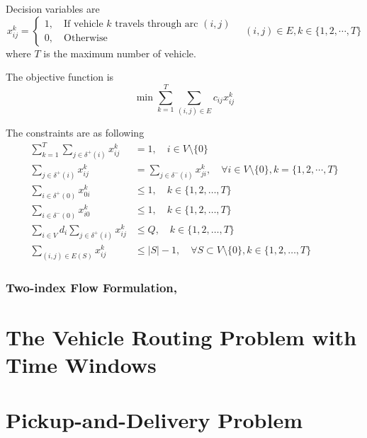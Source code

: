 					Decision variables are
					\begin{equation*}
						x_{ij}^k = \begin{cases}
										1, \quad \text{If vehicle } k \text{ travels through arc } (i, j) \\
										0, \quad \text{Otherwise}
									\end{cases} \quad (i, j) \in E, k \in \{1, 2, \cdots, T\}
					\end{equation*}
					where $T$ is the maximum number of vehicle.

					The objective function is
					\begin{equation*}
						\min \sum_{k = 1}^T \sum_{(i, j) \in E} c_{ij} x_{ij}^k
					\end{equation*}

					The constraints are as following
					\begin{align}
						\sum_{k = 1}^T \sum_{j \in \delta^+(i)} x_{ij}^k &= 1, \quad i \in V \setminus \{0\} \label{VRP:con:GoldenArcAssign}\\
						\sum_{j \in \delta^+(i)} x_{ij}^k &= \sum_{j \in \delta^-(i)} x_{ji}^k, \quad \forall i \in V \setminus \{0\}, k = \{1, 2, \cdots, T\} \label{VRP:con:GoldenBalance} \\
						\sum_{i \in \delta^+(0)} x_{0i}^k &\le 1, \quad k \in \{1, 2, \ldots, T\} \label{VRP:con:GoldenLeaveDepot} \\
						\sum_{i \in \delta^-(0)} x_{i0}^k &\le 1, \quad k \in \{1, 2, \ldots, T\} \label{VRP:con:GoldenReturnDepot} \\
						\sum_{i \in V} d_i \sum_{j \in \delta^+(i)} x_{ij}^k &\le Q, \quad k \in \{1, 2, \ldots, T\} \label{VRP:con:GoldenCap}\\
						\sum_{(i, j)\in E(S)} x_{ij}^k &\le |S| - 1, \quad \forall S\subset V\setminus \{0\}, k \in \{1, 2, \ldots, T\} \label{VRP:con:GoldenSubtour}
					\end{align}

				\subsection{Two-index Flow Formulation, }

		\chapter{The Vehicle Routing Problem with Time Windows}

		\chapter{Pickup-and-Delivery Problem}\label{chp:PDP}
